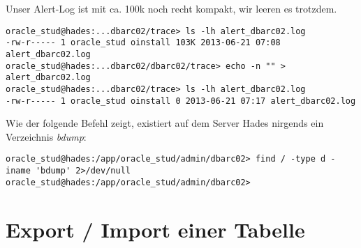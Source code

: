 \documentclass[11pt,a4paper,parskip=half]{scrartcl}
\begin{document}
Unser Alert-Log ist mit ca. 100k noch recht kompakt, wir leeren es trotzdem.
\begin{lstlisting}
oracle_stud@hades:...dbarc02/trace> ls -lh alert_dbarc02.log 
-rw-r----- 1 oracle_stud oinstall 103K 2013-06-21 07:08 alert_dbarc02.log
oracle_stud@hades:...dbarc02/dbarc02/trace> echo -n "" > alert_dbarc02.log 
oracle_stud@hades:...dbarc02/trace> ls -lh alert_dbarc02.log 
-rw-r----- 1 oracle_stud oinstall 0 2013-06-21 07:17 alert_dbarc02.log
\end{lstlisting}

Wie der folgende Befehl zeigt, existiert auf dem Server Hades nirgends ein Verzeichnis \emph{bdump}:
\begin{lstlisting}
oracle_stud@hades:/app/oracle_stud/admin/dbarc02> find / -type d -iname 'bdump' 2>/dev/null 
oracle_stud@hades:/app/oracle_stud/admin/dbarc02>
\end{lstlisting}


\newpage
\section{Export / Import einer Tabelle}
\end{document}
